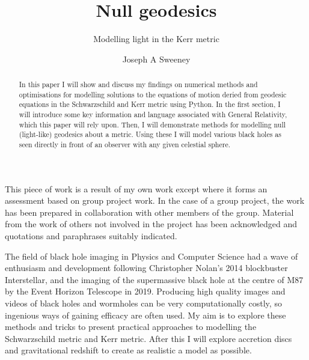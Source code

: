 \documentclass[oneside,openright,frontopenright]{dmathesis}
\begin{document}
\title{Null geodesics}
\subtitle{Modelling light in the Kerr metric}
\author{Joseph A Sweeney}
\maketitlepage*

\begin{abstract}
%
	In this paper I will show and discuss my findings on numerical methods and optimisations for modelling solutions to the equations of motion deried from geodesic equations in the Schwarzschild and Kerr metric using Python. In the first section, I will introduce some key information and language associated with General Relativity, which this paper will rely upon. Then, I will demonstrate methods for modelling null (light-like) geodesics about a metric. Using these I will model various black holes as seen directly in front of an observer with any given celestial sphere.
%
\end{abstract}

\begin{declaration*}
%
	This piece of work is a result of my own work except where it forms an assessment based on group project work. In the case of a group project, the work has been prepared in collaboration with other members of the group. Material from the work of others not involved in the project has been acknowledged and quotations and paraphrases suitably indicated.
%
\end{declaration*}

\disableprotrusion
\tableofcontents*
\enableprotrusion

\cleardoublepage
{}

%
%
%
%
\begin{introduction}

	The field of black hole imaging in Physics and Computer Science had a wave of enthusiasm 
	and development following Christopher Nolan’s 2014 blockbuster Interstellar\cite{Interstellar}, and the imaging of the supermassive 
	black hole at the centre of M87 by the Event Horizon Telescope in 2019\cite{event2019first}. Producing high quality images 
	and videos of black holes and wormholes can be very computationally costly, so ingenious ways of gaining 
	efficacy are often used. My aim is to explore these methods and tricks to present practical approaches 
	to modelling the Schwarzschild metric and Kerr metric. After this I will explore accretion discs and gravitational redshift to create as realistic a model as possible.

\end{introduction}
\end{document}
